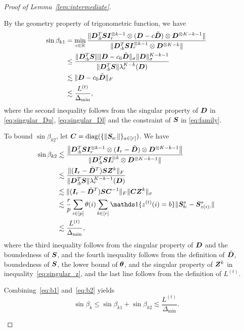 \documentclass[journal]{IEEEtran}
\theoremstyle{definition}
\theoremstyle{definition}
\def\fixme#1#2{\textbf{\color{red}[FIXME (#1): #2]}}
\begin{document}
\begin{proof}[Proof of Lemma~\ref{lem:intermediate}]
\begin{enumerate}[wide]
    By the geometry property of trigonometric function, we have
    \begin{align}
        \sin \beta_{k1} &= \min_{c \in \bbR} \frac{\onormSize{}{\mD_{:b}^{T} \mS \mI_r^{\otimes k-1} \otimes (\mD - c \tilde \mD) \otimes \mD^{\otimes K-k - 1} } }{ \onormSize{}{\mD_{:b}^{T} \mS \mI_r^{\otimes k-1} \otimes \mD^{\otimes K-k}} }\\
        &\leq \frac{ \onormSize{}{\mD_{:b}^{T} \mS} \onormSize{}{\mD - c_0 \tilde \mD}_{\sigma} \onormSize{}{\mD}_{\sigma}^{K-k-1} }{\onormSize{}{\mD_{:b}^{T} \mS} \lambda_r^{K-k}(\mD) }\\
        & \lesssim  \onormSize{}{\mD - c_0 \tilde \mD}_{F}\\
        & \lesssim \frac{L^{(t)}}{\Delta_{\min}}, \label{eq:b1}
    \end{align}
    where the second inequality follows from the singular property of $\bm{D}$ in \eqref{eq:singular_Du}, \eqref{eq:singular_Dl} and the constraint of $\bm S$ in \eqref{eq:family}.
    
    To bound $\sin \beta_{k2}$, let $\bm C = \text{diag}(\{\lVert\bm S_{a:}\rVert\}_{a \in [r]})$. We have 
    \begin{align}
        \sin \beta_{k2} &\lesssim \frac{ \onorm{\mD_{:b}^{T} \mS \mI_r^{\otimes k-1} \otimes (\mI_r - \tilde \mD) \otimes \mD^{\otimes K-k-1} } }{\onormSize{}{\mD_{:b}^{T} \mS \mI_r^{\otimes k} \otimes \mD^{\otimes K-k-1} }  }\\
        & \lesssim \frac{ \onormSize{}{(\mI_r - \tilde \mD^T) \mS \mZ^k}_F }{\onormSize{}{\mD_{:b}^{T} \mS} \lambda_r^{K-k-1}(\mD)} \\
        & \lesssim \onormSize{ }{(\mI_r - \tilde \mD^T) \mS \mC^{-1}}_F \onormSize{}{\mC \mZ^k}_{\sigma}\\
        & \lesssim \frac{r}{p} \sum_{i \in [p]} \theta(i) \sum_{b \in [r]} \ind\{z^{(t)}(i) = b\} \onormSize{}{\mS_{b:}^s - \mS_{z(i):}^s} \\
        & \lesssim \frac{L^{(t)}}{\Delta_{\min}}, \label{eq:b2} %
    \end{align}
    where the third inequality follows from the singular property of $\bm{D}$ and the boundedness of $\bm S$, and the fourth inequality follows from the definition of $\tilde {\bm{D}}$, boundedness of $\bm S$, the lower bound of $\boldsymbol{\theta}$, and the singular property of $\bm Z^k$ in inequality~\eqref{eq:singular_z}, and the last line follows from the definition of $L^{(t)}$.
    
  Combining~\eqref{eq:b1} and~\eqref{eq:b2} yields
    \begin{equation}
        \sin \beta_k \leq \sin \beta_{k1} + \sin \beta_{k2} \lesssim \frac{L^{(t)}}{\Delta_{\min}}.
    \end{equation}


\end{enumerate}
\end{proof}
\end{document}
